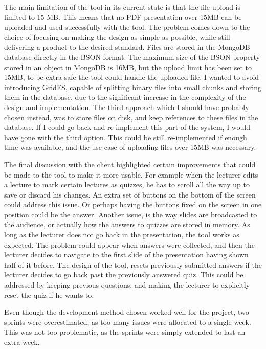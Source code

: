 The main limitation of the tool in its current state is that the file upload
is limited to 15 MB. This means that no PDF presentation over 15MB can be uploaded
and used successfully with the tool. The problem comes down to the choice of
focusing on making the design as simple as possible, while still delivering a
product to the desired standard. Files are stored in the MongoDB database directly
in the BSON format. The maximum size of the BSON property stored in an object in
MongoDB is 16MB, but the upload limit has been set to 15MB, to be extra safe the tool could
handle the uploaded file. I wanted to avoid introducing GridFS, capable of
splitting binary files into small chunks and storing them in the database, due
to the significant increase in the complexity of the design and implementation.
The third approach which I should have probably chosen instead, was to store files
on disk, and keep references to these files in the database. If I could go back
and re-implement this part of the system, I would have gone with the third option.
This could be still re-implemented if enough time was available, and the use case
of uploading files over 15MB was necessary.

The final discussion with the client highlighted certain improvements that could
be made to the tool to make it more usable. For example when the lecturer edits
a lecture to mark certain lectures as quizzes, he has to scroll all the way up to
save or discard his changes. An extra set of buttons on the bottom of the screen
could address this issue. Or perhaps having the buttons fixed on the screen
in one position could be the answer. Another issue, is the way slides are broadcasted
to the audience, or actually how the answers to quizzes are stored in memory.
As long as the lecturer does not go back in the presentation, the tool works
as expected. The problem could appear when answers were collected, and then the
lecturer decides to navigate to the first slide of the presentation having shown half
of it before. The design of the tool, resets previously submitted answers if
the lecturer decides to go back past the previously answered quiz. This could be addressed by
keeping previous questions, and making the lecturer to explicitly reset the
quiz if he wants to.

Even though the development method chosen worked well for the project, two
sprints were overestimated, as too many issues were allocated to a single week.
This was not too problematic, as the sprints were simply extended to last an extra
week.

